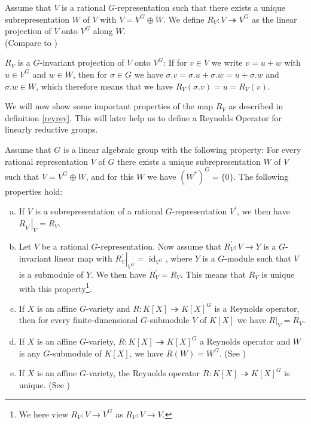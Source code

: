 \begin{definition}\label{reyrey}
  Assume that $V$ is a rational $G$-representation such that there exists a unique subrepresentation $W$ of $V$ with $V = V^G \oplus W$.
  We define $R_V \colon V \twoheadrightarrow V^G$ as the linear projection of $V$ onto $V^G$ along $W$.  \\
  (Compare to \cite[2.2.5 (b)$\implies$(c)]{DK15})
\end{definition}

\begin{remark}
  $R_V$ is a $G$-invariant projection of $V$ onto $V^G$:
  If for $v \in V$ we write $v = u + w$ with $u \in V^G$ and $w \in W$, then for $\sigma \in G$ we have \linebreak$\sigma.v = \sigma.u + \sigma.w = u + \sigma.w$ and $\sigma.w \in W$, which therefore means that we have \linebreak$R_V(\sigma.v) = u = R_V(v)$.
\end{remark}

We will now show some important properties of the map $R_V$ as described in definition \ref{reyrey}.
This will later help us to define a Reynolds Operator for linearly reductive groups.

\begin{lemma}\label{lamm}
  Assume that $G$ is a linear algebraic group with the following \linebreak property:
  For every rational representation $V$ of $G$ there exists a unique subrepresentation $W$ of $V$ such that $V = V^G \oplus W$, and for this $W$ we have $(W^\ast)^G = \{0\}$.
  The following properties hold:
  \begin{enumerate}[(a)]
  \item If $V$ is a subrepresentation of a rational $G$-representation $V^\prime$, we then have $\left. R_{V^\prime} \right|_V = R_V$.
  \item Let $V$ be a rational $G$-representation.
    Now assume that $R^\prime_V \colon V \rightarrow Y$ is a $G$-invariant linear map with $ \left. R^\prime_V \right|_{V^G} = \operatorname{id}_{V^G}$, where $Y$ is a $G$-module such that $V$ is a submodule of $Y$.
    We then have $R^\prime_V = R_V$.
    This means that $R_V$ is unique with this property\footnote{We here view $R_V \colon V \rightarrow V^G$ as $R_V \colon V \rightarrow V$.}.
  \item If $X$ is an affine $G$-variety and $R \colon K[X] \twoheadrightarrow K[X]^G$ is a Reynolds \linebreak operator, then for every finite-dimensional $G$-submodule $V$ of $K[X]$ we have \linebreak$\left. R \right|_V = R_V$.
  \item If $X$ is an affine $G$-variety, $R \colon K[X] \twoheadrightarrow K[X]^G$ a Reynolds operator and $W$ is any $G$-submodule of $K[X]$, we have $R(W) = W^G$.  (See \cite[2.2.7]{DK15})
  \item If $X$ is an affine $G$-variety, the Reynolds operator $R\colon K[X] \twoheadrightarrow K[X]^G$ is unique.  (See \cite[2.2.5 (b)$\implies$(c)]{DK15})
  \end{enumerate}
\end{lemma}

